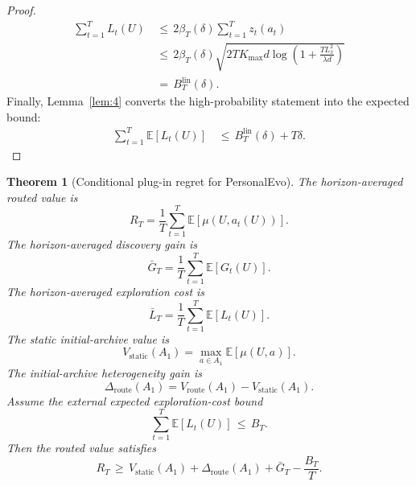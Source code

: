 \documentclass{article} %
\newtheorem{theorem}{Theorem}
\begin{document}
\begin{proof}
\begin{align}
\label{eq:app-lin-tax-final}
\sum_{t=1}^{T}L_t(U)
&\,\le\,
2\beta_T(\delta)
\sum_{t=1}^{T}z_t(a_t)
\\
&\,\le\,
2\beta_T(\delta)
\sqrt{
2T K_{\max}d
\log\!\left(1+\frac{T L_x^2}{\lambda d}\right)
}
\\
&\,=\,
B_T^{\mathrm{lin}}(\delta).
\end{align}
Finally, Lemma~\ref{lem:4} converts the high-probability statement into the expected bound:
\begin{align}
\label{eq:app-lin-expected-final}
\sum_{t=1}^{T}\mathbb{E}[L_t(U)]
&\,\le\,
B_T^{\mathrm{lin}}(\delta)+T\delta.
\end{align}
\end{proof}

\begin{theorem}[Conditional plug-in regret for PersonalEvo]
\label{thm:convergence}
The horizon-averaged routed value is
\begin{equation}
\label{eq:app-plugin-rt}
R_T
=
\frac{1}{T}
\sum_{t=1}^{T}
\mathbb{E}[\mu(U,a_t(U))].
\end{equation}
The horizon-averaged discovery gain is
\begin{equation}
\label{eq:app-plugin-gbar}
\bar G_T
=
\frac{1}{T}
\sum_{t=1}^{T}
\mathbb{E}[G_t(U)].
\end{equation}
The horizon-averaged exploration cost is
\begin{equation}
\label{eq:app-plugin-lbar}
\bar L_T
=
\frac{1}{T}
\sum_{t=1}^{T}
\mathbb{E}[L_t(U)].
\end{equation}
The static initial-archive value is
\begin{equation}
\label{eq:app-plugin-vstatic}
V_{\mathrm{static}}(A_1)
=
\max_{a\in A_1}
\mathbb{E}[\mu(U,a)].
\end{equation}
The initial-archive heterogeneity gain is
\begin{equation}
\label{eq:app-plugin-delta}
\Delta_{\mathrm{route}}(A_1)
=
V_{\mathrm{route}}(A_1)-V_{\mathrm{static}}(A_1).
\end{equation}
Assume the external expected exploration-cost bound
\begin{equation}
\label{eq:app-plugin-tax-assumption}
\sum_{t=1}^{T}\mathbb{E}[L_t(U)]
\,\le\,
B_T.
\end{equation}
Then the routed value satisfies
\begin{equation}
\label{eq:app-plugin-bound}
R_T
\,\ge\,
V_{\mathrm{static}}(A_1)
+
\Delta_{\mathrm{route}}(A_1)
+
\bar G_T
-
\frac{B_T}{T}.
\end{equation}
\end{theorem}
\end{document}
